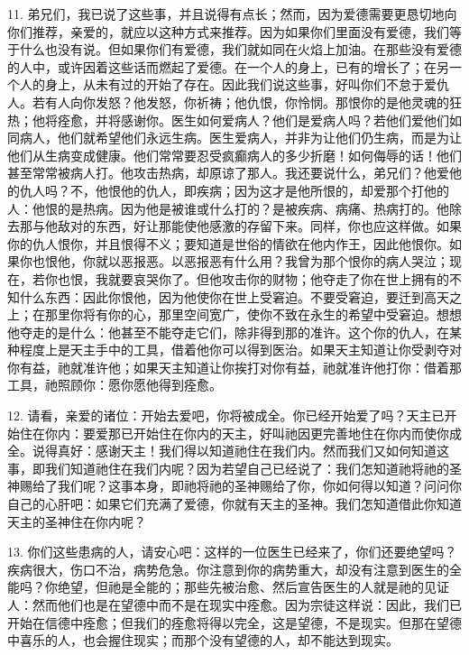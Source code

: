 11. 弟兄们，我已说了这些事，并且说得有点长；然而，因为爱德需要更恳切地向你们推荐，亲爱的，就应以这种方式来推荐。因为如果你们里面没有爱德，我们等于什么也没有说。但如果你们有爱德，我们就如同在火焰上加油。在那些没有爱德的人中，或许因着这些话而燃起了爱德。在一个人的身上，已有的增长了；在另一个人的身上，从未有过的开始了存在。因此我们说这些事，好叫你们不怠于爱仇人。若有人向你发怒？他发怒，你祈祷；他仇恨，你怜悯。那恨你的是他灵魂的狂热；他将痊愈，并将感谢你。医生如何爱病人？他们是爱病人吗？若他们爱他们如同病人，他们就希望他们永远生病。医生爱病人，并非为让他们仍生病，而是为让他们从生病变成健康。他们常常要忍受疯癫病人的多少折磨！如何侮辱的话！他们甚至常常被病人打。他攻击热病，却原谅了那人。我还要说什么，弟兄们？他爱他的仇人吗？不，他恨他的仇人，即疾病；因为这才是他所恨的，却爱那个打他的人：他恨的是热病。因为他是被谁或什么打的？是被疾病、病痛、热病打的。他除去那与他敌对的东西，好让那能使他感激的存留下来。同样，你也应这样做。如果你的仇人恨你，并且恨得不义；要知道是世俗的情欲在他内作王，因此他恨你。如果你也恨他，你就以恶报恶。以恶报恶有什么用？我曾为那个恨你的病人哭泣；现在，若你也恨，我就要哀哭你了。但他攻击你的财物；他夺走了你在世上拥有的不知什么东西：因此你恨他，因为他使你在世上受窘迫。不要受窘迫，要迁到高天之上；在那里你将有你的心，那里空间宽广，使你不致在永生的希望中受窘迫。想想他夺走的是什么：他甚至不能夺走它们，除非得到那的准许。这个你的仇人，在某种程度上是天主手中的工具，借着他你可以得到医治。如果天主知道让你受剥夺对你有益，祂就准许他；如果天主知道让你挨打对你有益，祂就准许他打你：借着那工具，祂照顾你：愿你愿他得到痊愈。\par

12. 请看，亲爱的诸位：开始去爱吧，你将被成全。你已经开始爱了吗？天主已开始住在你内：要爱那已开始住在你内的天主，好叫祂因更完善地住在你内而使你成全。说得真好：感谢天主！我们得以知道祂住在我们内。然而我们又如何知道这事，即我们知道祂住在我们内呢？因为若望自己已经说了：我们怎知道祂将祂的圣神赐给了我们呢？这事本身，即祂将祂的圣神赐给了你，你如何得以知道？问问你自己的心肝吧：如果它们充满了爱德，你就有天主的圣神。我们怎知道借此你知道天主的圣神住在你内呢？\par

13. 你们这些患病的人，请安心吧：这样的一位医生已经来了，你们还要绝望吗？疾病很大，伤口不治，病势危急。你注意到你的病势重大，却没有注意到医生的全能吗？你绝望，但祂是全能的；那些先被治愈、然后宣告医生的人就是祂的见证人：然而他们也是在望德中而不是在现实中痊愈。因为宗徒这样说：因此，我们已开始在信德中痊愈；但我们的痊愈将得以完全，这是望德，不是现实。但那在望德中喜乐的人，也会握住现实；而那个没有望德的人，却不能达到现实。\par

